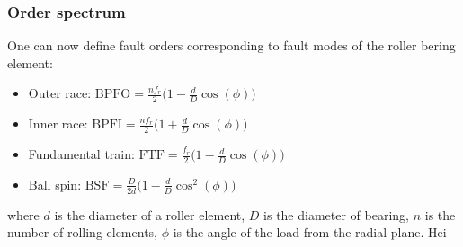 \begin{frame}
    \frametitle{Order spectrum}
    \small
    
    One can now define fault orders corresponding to fault modes of the roller bering element:
    
    \begin{itemize}
        \item Outer race: $\text{BPFO}=\frac{nf_r}{2} \big( 1 - \frac{d}{D} \cos(\phi) \big) $
        
        \item Inner race: $\text{BPFI}=\frac{nf_r}{2} \big( 1 + \frac{d}{D} \cos(\phi) \big) $
        
        \item Fundamental train: $\text{FTF}=\frac{f_r}{2} \big( 1 - \frac{d}{D} \cos(\phi) \big) $
        
        \item Ball spin: $\text{BSF}=\frac{D}{2d} \big( 1 - \frac{d}{D} \cos^2(\phi) \big) $
    \end{itemize}
    
    where $d$ is the diameter of a roller element, $D$ is the diameter of bearing, $n$ is the number of rolling elements, $\phi$ is the angle of the load from the radial plane. Hei
   
\end{frame}